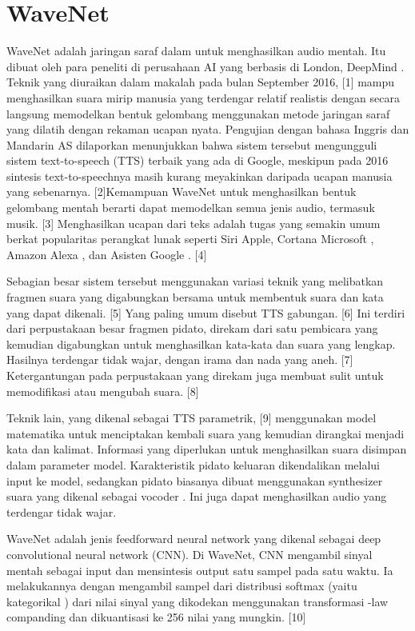 \section{WaveNet}
WaveNet adalah jaringan saraf dalam untuk menghasilkan audio mentah. Itu dibuat oleh para peneliti di perusahaan AI yang berbasis di London, DeepMind . Teknik yang diuraikan dalam makalah pada bulan September 2016, [1] mampu menghasilkan suara mirip manusia yang terdengar relatif realistis dengan secara langsung memodelkan bentuk gelombang menggunakan metode jaringan saraf yang dilatih dengan rekaman ucapan nyata. Pengujian dengan bahasa Inggris dan Mandarin AS dilaporkan menunjukkan bahwa sistem tersebut mengungguli sistem text-to-speech (TTS) terbaik yang ada di Google, meskipun pada 2016 sintesis text-to-speechnya masih kurang meyakinkan daripada ucapan manusia yang sebenarnya. [2]Kemampuan WaveNet untuk menghasilkan bentuk gelombang mentah berarti dapat memodelkan semua jenis audio, termasuk musik. [3]
Menghasilkan ucapan dari teks adalah tugas yang semakin umum berkat popularitas perangkat lunak seperti Siri Apple, Cortana Microsoft , Amazon Alexa , dan Asisten Google . [4]

Sebagian besar sistem tersebut menggunakan variasi teknik yang melibatkan fragmen suara yang digabungkan bersama untuk membentuk suara dan kata yang dapat dikenali. [5] Yang paling umum disebut TTS gabungan. [6] Ini terdiri dari perpustakaan besar fragmen pidato, direkam dari satu pembicara yang kemudian digabungkan untuk menghasilkan kata-kata dan suara yang lengkap. Hasilnya terdengar tidak wajar, dengan irama dan nada yang aneh. [7] Ketergantungan pada perpustakaan yang direkam juga membuat sulit untuk memodifikasi atau mengubah suara. [8]

Teknik lain, yang dikenal sebagai TTS parametrik, [9] menggunakan model matematika untuk menciptakan kembali suara yang kemudian dirangkai menjadi kata dan kalimat. Informasi yang diperlukan untuk menghasilkan suara disimpan dalam parameter model. Karakteristik pidato keluaran dikendalikan melalui input ke model, sedangkan pidato biasanya dibuat menggunakan synthesizer suara yang dikenal sebagai vocoder . Ini juga dapat menghasilkan audio yang terdengar tidak wajar.

WaveNet adalah jenis feedforward neural network yang dikenal sebagai deep convolutional neural network (CNN). Di WaveNet, CNN mengambil sinyal mentah sebagai input dan mensintesis output satu sampel pada satu waktu. Ia melakukannya dengan mengambil sampel dari distribusi softmax (yaitu kategorikal ) dari nilai sinyal yang dikodekan menggunakan transformasi -law companding dan dikuantisasi ke 256 nilai yang mungkin. [10]

